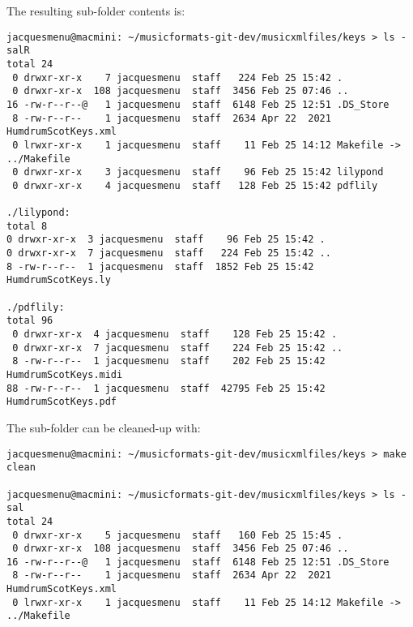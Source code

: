 The resulting sub-folder contents is:
\begin{lstlisting}[language=Terminal]
jacquesmenu@macmini: ~/musicformats-git-dev/musicxmlfiles/keys > ls -salR
total 24
 0 drwxr-xr-x    7 jacquesmenu  staff   224 Feb 25 15:42 .
 0 drwxr-xr-x  108 jacquesmenu  staff  3456 Feb 25 07:46 ..
16 -rw-r--r--@   1 jacquesmenu  staff  6148 Feb 25 12:51 .DS_Store
 8 -rw-r--r--    1 jacquesmenu  staff  2634 Apr 22  2021 HumdrumScotKeys.xml
 0 lrwxr-xr-x    1 jacquesmenu  staff    11 Feb 25 14:12 Makefile -> ../Makefile
 0 drwxr-xr-x    3 jacquesmenu  staff    96 Feb 25 15:42 lilypond
 0 drwxr-xr-x    4 jacquesmenu  staff   128 Feb 25 15:42 pdflily

./lilypond:
total 8
0 drwxr-xr-x  3 jacquesmenu  staff    96 Feb 25 15:42 .
0 drwxr-xr-x  7 jacquesmenu  staff   224 Feb 25 15:42 ..
8 -rw-r--r--  1 jacquesmenu  staff  1852 Feb 25 15:42 HumdrumScotKeys.ly

./pdflily:
total 96
 0 drwxr-xr-x  4 jacquesmenu  staff    128 Feb 25 15:42 .
 0 drwxr-xr-x  7 jacquesmenu  staff    224 Feb 25 15:42 ..
 8 -rw-r--r--  1 jacquesmenu  staff    202 Feb 25 15:42 HumdrumScotKeys.midi
88 -rw-r--r--  1 jacquesmenu  staff  42795 Feb 25 15:42 HumdrumScotKeys.pdf
\end{lstlisting}

The sub-folder can be cleaned-up with:
\begin{lstlisting}[language=Terminal]
jacquesmenu@macmini: ~/musicformats-git-dev/musicxmlfiles/keys > make clean

jacquesmenu@macmini: ~/musicformats-git-dev/musicxmlfiles/keys > ls -sal
total 24
 0 drwxr-xr-x    5 jacquesmenu  staff   160 Feb 25 15:45 .
 0 drwxr-xr-x  108 jacquesmenu  staff  3456 Feb 25 07:46 ..
16 -rw-r--r--@   1 jacquesmenu  staff  6148 Feb 25 12:51 .DS_Store
 8 -rw-r--r--    1 jacquesmenu  staff  2634 Apr 22  2021 HumdrumScotKeys.xml
 0 lrwxr-xr-x    1 jacquesmenu  staff    11 Feb 25 14:12 Makefile -> ../Makefile
\end{lstlisting}
